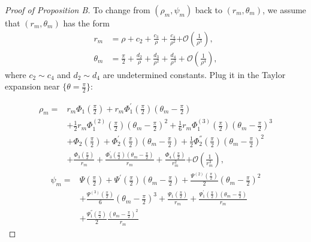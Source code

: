 \documentclass{article}
\numberwithin{figure}{section}
\numberwithin{equation}{section}
\theoremstyle{remark}
\theoremstyle{definition}
\begin{document}
\begin{proof}[Proof of Proposition B]
{    To change from \((\rho_{m},\psi_{m})\) back to \((r_{m},\theta_{m})\), we assume that $(r_m,\theta_m)$ has the form 
	\begin{equation}
		\begin{split}
			r_{m} &= \rho +c_2 + \frac{c_3}{\rho} + \frac{c_4}{\rho^{2}}\mathcal{+ O}\left( \frac{1}{\rho^{3}} \right),\\
			\theta_{m} &= \frac{\pi}{2} + \frac{d_2}{\rho} + \frac{d_3}{\rho^{2}} + \frac{d_4}{\rho^{3}} + \mathcal{O}\left( \frac{1}{\rho^{4}} \right),
		\end{split}
	\end{equation}
where $c_2\sim c_4$ and $d_2\sim d_4$ are undetermined constants. Plug it in the Taylor expansion near \(\{\theta = \frac{\pi}{2}\}\):
	
	\begin{equation}\label{Taylorrho}
    \begin{split}
		\rho_{m} =& r_{m}\Phi_{1}(\frac{\pi}{2}) + r_{m}\Phi_{1}^{'}(\frac{\pi}{2})\left( \theta_{m} - \frac{\pi}{2} \right) \\
		&+ \frac{1}{2}r_{m}{\Phi}_{1}^{(2)}(\frac{\pi}{2})\left( \theta_{m} - \frac{\pi}{2} \right)^{2}+ \frac{1}{6}r_{m}{\Phi}_{1}^{(3)}(\frac{\pi}{2})\left( \theta_{m} - \frac{\pi}{2} \right)^{3} \\
		& + \Phi_{2}(\frac{\pi}{2}) + \Phi_{2}^{'}(\frac{\pi}{2})\left( \theta_{m} - \frac{\pi}{2} \right)+ \frac{1}{2}{\Phi}_{2}^{''}(\frac{\pi}{2})\left( \theta_{m} - \frac{\pi}{2} \right)^{2} \\
		&+\frac{\Phi_{3}(\frac{\pi}{2})}{r_{m}} + \frac{\Phi_{3}^{'}(\frac{\pi}{2})\left( \theta_{m} - \frac{\pi}{2} \right)}{r_{m}} + \frac{\Phi_{4}(\frac{\pi}{2})}{r_{m}^{2}}\mathcal{+ O}\left( \frac{1}{r_{m}^{3}} \right),
        \end{split}
	\end{equation}
	\begin{equation}\label{Taylorpsi}
    \begin{split}
		\psi_{m} = &\Psi(\frac{\pi}{2}) + \Psi^{'}(\frac{\pi}{2})\left( \theta_{m} - \frac{\pi}{2} \right) + \frac{\Psi^{(2)}(\frac{\pi}{2})}{2}\left( \theta_{m} - \frac{\pi}{2} \right)^{2} \\
		&+ \frac{\Psi^{(3)}(\frac{\pi}{2})}{6}\left( \theta_{m} - \frac{\pi}{2} \right)^{3} 
		+ \frac{\Psi_{1}(\frac{\pi}{2})}{r_{m}} + \frac{\Psi_{1}^{'}(\frac{\pi}{2})\left( \theta_{m} - \frac{\pi}{2} \right)}{r_{m}} \\
		& + \frac{\Psi_{1}^{''}(\frac{\pi}{2})}{2}\frac{\left( \theta_{m} - \frac{\pi}{2} \right)^{2}}{r_{m}}  

\end{split}
\end{equation}}
\end{proof}
\end{document}

